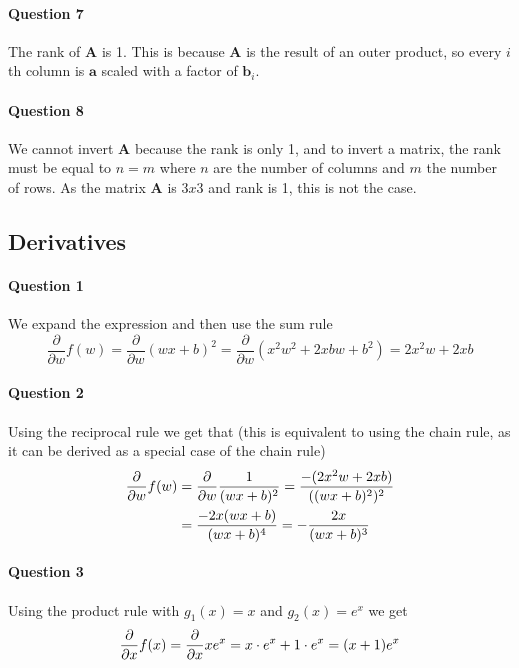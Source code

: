 \documentclass[a4paper, 11pt]{article}
\newcommand{\vect}[1]{\mathbf{#1}}
\newcommand{\mat}[1]{\textbf{#1}}
\begin{document}
\paragraph{Question 7}
The rank of $\mat A$ is 1. This is because $\mat A$ is the result of an outer product, so every $i$th column is $\vect a$ scaled with a factor of $\vect b_i$.

\paragraph{Question 8}
We cannot invert $\mat A$ because the rank is only 1, and to invert a matrix, the rank must be equal to $n=m$ where $n$ are the number of columns and $m$ the number of rows. As the matrix $\mat A$ is $3x3$ and rank is 1, this is not the case.

\subsection{Derivatives}
\label{sub:derivatives}

\paragraph{Question 1}
We expand the expression and then use the sum rule
\[
    \frac{\partial}{\partial w}f(w) = \frac{\partial}{\partial w} (wx+b)^2 = \frac{\partial}{\partial w} \left(x^2w^2+2xbw+b^2 \right) = 2x^2w+2xb
\]

\paragraph{Question 2}
Using the reciprocal rule we get that (this is equivalent to using the chain rule, as it can be derived as a special case of the chain rule)
\begin{align*}
    {\partial \over \partial w} f(w)
    &= {\partial \over \partial w} {1 \over (wx+b)^2}
    = {-(2x^2 w + 2xb) \over ((wx+b)^2)^2} \\
    &= {-2x (wx + b) \over (wx+b)^4}
    = - {2x \over (wx + b)^3}
\end{align*}

\paragraph{Question 3}
Using the product rule with $g_1(x) = x$ and $g_2(x) = e^x$ we get
\[
    {\partial \over \partial x} f(x)
    = {\partial \over \partial x} x e^x
    = x \cdot e^x + 1 \cdot e^x
    = (x + 1) e^x
\]
\end{document}
